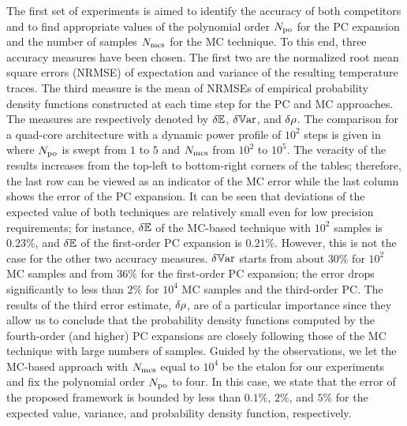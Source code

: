 
%
%
%
The first set of experiments is aimed to identify the accuracy of both competitors and to find appropriate values of the polynomial order ${N_\text{po}}$ for the PC expansion and the number of samples $N_\text{mcs}$ for the MC technique. To this end, three accuracy measures have been chosen. The first two are the normalized root mean square errors (NRMSE) of expectation and variance of the resulting temperature traces. The third measure is the mean of NRMSEs of empirical probability density functions constructed at each time step for the PC and MC approaches. The measures are respectively denoted by $\delta\mathbb{E}$, $\delta\mathbb{V}\text{ar}$, and $\delta\rho$. The comparison for a quad-core architecture with a dynamic power profile of $10^2$ steps is given in  where ${N_\text{po}}$ is swept from $1$ to $5$ and $N_\text{mcs}$ from $10^2$ to $10^5$. The veracity of the results increases from the top-left to bottom-right corners of the tables; therefore, the last row can be viewed as an indicator of the MC error while the last column shows the error of the PC expansion. It can be seen that deviations of the expected value of both techniques are relatively small even for low precision requirements; for instance, $\delta\mathbb{E}$ of the MC-based technique with $10^2$ samples is $0.23\%$, and $\delta\mathbb{E}$ of the first-order PC expansion is $0.21\%$. However, this is not the case for the other two accuracy measures. $\delta\mathbb{V}\text{ar}$ starts from about $30\%$ for $10^2$ MC samples and from $36\%$ for the first-order PC expansion; the error drops significantly to less than $2\%$ for $10^4$ MC samples and the third-order PC. The results of the third error estimate, $\delta\rho$, are of a particular importance since they allow us to conclude that the probability density functions computed by the fourth-order (and higher) PC expansions are closely following those of the MC technique with large numbers of samples. Guided by the observations, we let the MC-based approach with $N_\text{mcs}$ equal to $10^4$ be the etalon for our experiments and fix the polynomial order ${N_\text{po}}$ to four. In this case, we state that the error of the proposed framework is bounded by less than $0.1\%$, $2\%$, and $5\%$ for the expected value, variance, and probability density function, respectively.


